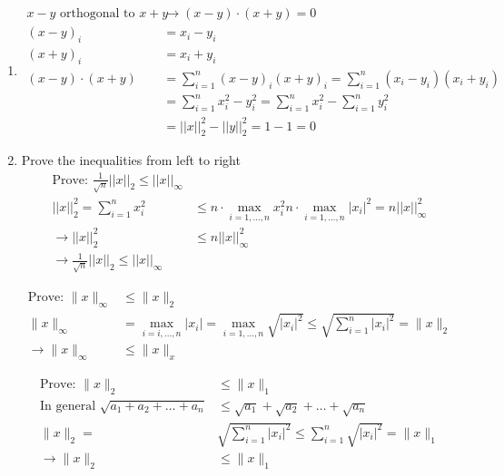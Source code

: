 \documentclass[11pt]{article}
\begin{document}
\begin{solution}
\begin{enumerate}
\item
\begin{align*}
    x - y \text{ orthogonal to } x + y &\rightarrow (x-y) \cdot (x+y) = 0 \\
    (x-y)_i &= x_i - y_i \\
    (x+y)_i &= x_i + y_i \\
    (x-y) \cdot (x+y) &= \sum_{i=1}^n (x-y)_i (x+y)_i = \sum_{i=1}^n (x_i-y_i)(x_i+y_i) \\
    &= \sum_{i=1}^n x_i^2 - y_i^2 = \sum_{i=1}^n x_i^2 - \sum_{i=1}^n y_i^2 \\
    &= ||x||_2^2 - ||y||_2^2 = 1 - 1 = 0
\end{align*}

\item Prove the inequalities from left to right
\begin{align*}
    \text{Prove: } \frac{1}{\sqrt{n}} ||x||_2 \leq ||x||_{\infty} \\
    ||x||_2^2 = \sum_{i=1}^n x_i^2 &\leq n \cdot \max_{i=1,\dots,n} x_i^2 n \cdot \max_{i=1,\dots,n} |x_i|^2 = n ||x||_{\infty}^2 \\
    \rightarrow ||x||_2^2 &\leq n ||x||_{\infty}^2 \\
    \rightarrow \frac{1}{\sqrt{n}} ||x||_2 \leq ||x||_{\infty}
\end{align*}

\begin{align*}
    \text{Prove: } \|x\|_{\infty} &\leq \|x\|_2 \\
    \|x\|_{\infty} &= \max_{i=i,\dots,n} |x_i| = \max_{i=1,\dots,n} \sqrt{|x_i|^2} \leq \sqrt{\sum_{i=1}^n |x_i|^2} = \|x\|_2 \\
    \rightarrow \|x\|_{\infty} &\leq \|x\|_x
\end{align*}

\begin{align*}
    \text{Prove: } \|x\|_2 &\leq \|x\|_1 \\
    \text{In general } \sqrt{a_1 + a_2 + \dots + a_n} &\leq \sqrt{a_1} + \sqrt{a_2} + \dots + \sqrt{a_n} \\
    \|x\|_2 = &\sqrt{\sum_{i=1}^n |x_i|^2} \leq \sum_{i=1}^n \sqrt{|x_i|^2} = \|x\|_1 \\
    \rightarrow \|x\|_2 &\leq \|x\|_1
\end{align*}

\begin{align*}

\end{align*}
\end{enumerate}
\end{solution}
\end{document}
